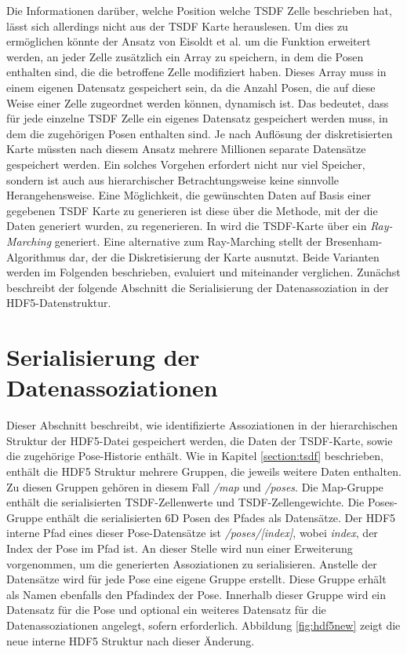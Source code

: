 Die Informationen darüber, welche Position welche TSDF Zelle beschrieben hat, lässt sich allerdings nicht aus der TSDF Karte herauslesen. Um dies zu ermöglichen könnte der Ansatz von Eisoldt et al. \cite{HATSDF} um die Funktion erweitert werden, an jeder Zelle zusätzlich ein Array zu speichern, in dem die Posen enthalten sind, die die betroffene Zelle modifiziert haben. Dieses Array muss in einem eigenen Datensatz gespeichert sein, da die Anzahl Posen, die auf diese Weise einer Zelle zugeordnet werden können, dynamisch ist. Das bedeutet, dass für jede einzelne TSDF Zelle ein eigenes Datensatz gespeichert werden muss, in dem die zugehörigen Posen enthalten sind. Je nach Auflösung der diskretisierten Karte müssten nach diesem Ansatz mehrere Millionen separate Datensätze gespeichert werden. Ein solches Vorgehen erfordert nicht nur viel Speicher, sondern ist auch aus hierarchischer Betrachtungsweise keine sinnvolle Herangehensweise.
Eine Möglichkeit, die gewünschten Daten auf Basis einer gegebenen TSDF Karte zu generieren ist diese über die Methode, mit der die Daten generiert wurden, zu regenerieren. In \cite{HATSDF} wird die TSDF-Karte über ein \emph{Ray-Marching} generiert. Eine alternative zum Ray-Marching stellt der Bresenham- Algorithmus \cite{bresenham1965algorithm} dar, der die Diskretisierung der Karte ausnutzt.
Beide Varianten werden im Folgenden beschrieben, evaluiert und miteinander verglichen.
Zunächst beschreibt der folgende Abschnitt die Serialisierung der Datenassoziation in der HDF5-Datenstruktur.

\section{Serialisierung der Datenassoziationen}


Dieser Abschnitt beschreibt, wie identifizierte Assoziationen in der hierarchischen Struktur der HDF5-Datei gespeichert werden, die Daten der TSDF-Karte, sowie die zugehörige Pose-Historie enthält.
Wie in Kapitel \ref{section:tsdf} beschrieben, enthält die HDF5 Struktur mehrere Gruppen, die jeweils weitere Daten enthalten. Zu diesen Gruppen gehören in diesem Fall \textit{/map} und \textit{/poses}.
Die Map-Gruppe enthält die serialisierten TSDF-Zellenwerte und TSDF-Zellengewichte. Die Poses-Gruppe enthält die serialisierten 6D Posen des Pfades als Datensätze.
Der HDF5 interne Pfad eines dieser Pose-Datensätze ist \textit{/poses/[index]}, wobei \textit{index}, der Index der Pose im Pfad ist.
An dieser Stelle wird nun einer Erweiterung vorgenommen, um die generierten Assoziationen zu serialisieren. Anstelle der Datensätze wird für jede Pose eine eigene Gruppe erstellt. Diese Gruppe erhält als Namen ebenfalls den Pfadindex der Pose. Innerhalb dieser Gruppe wird ein Datensatz für die Pose und optional ein weiteres Datensatz für die Datenassoziationen angelegt, sofern erforderlich.
Abbildung \ref{fig:hdf5new} zeigt die neue interne HDF5 Struktur nach dieser Änderung.

